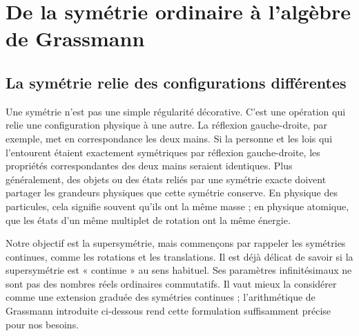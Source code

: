 \chapter{De la symétrie ordinaire à l’algèbre de Grassmann}


\section{La symétrie relie des configurations différentes}

Une symétrie n’est pas une simple régularité décorative. C’est une opération qui relie une configuration physique à une autre. La réflexion gauche-droite, par exemple, met en correspondance les deux mains. Si la personne et les lois qui l’entourent étaient exactement symétriques par réflexion gauche-droite, les propriétés correspondantes des deux mains seraient identiques. Plus généralement, des objets ou des états reliés par une symétrie exacte doivent partager les grandeurs physiques que cette symétrie conserve. En physique des particules, cela signifie souvent qu’ils ont la même masse ; en physique atomique, que les états d’un même multiplet de rotation ont la même énergie.

Notre objectif est la supersymétrie, mais commençons par rappeler les symétries continues, comme les rotations et les translations. Il est déjà délicat de savoir si la supersymétrie est « continue » au sens habituel. Ses paramètres infinitésimaux ne sont pas des nombres réels ordinaires commutatifs. Il vaut mieux la considérer comme une extension graduée des symétries continues ; l’arithmétique de Grassmann introduite ci-dessous rend cette formulation suffisamment précise pour nos besoins. 

